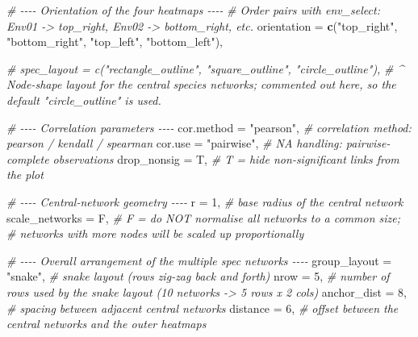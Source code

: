 \documentclass[
]{book}
\newenvironment{Shaded}{\begin{snugshade}}{\end{snugshade}}
\newcommand{\AttributeTok}[1]{\textcolor[rgb]{0.13,0.29,0.53}{#1}}
\newcommand{\CommentTok}[1]{\textcolor[rgb]{0.56,0.35,0.01}{\textit{#1}}}
\newcommand{\DecValTok}[1]{\textcolor[rgb]{0.00,0.00,0.81}{#1}}
\newcommand{\FunctionTok}[1]{\textcolor[rgb]{0.13,0.29,0.53}{\textbf{#1}}}
\newcommand{\NormalTok}[1]{#1}
\newcommand{\StringTok}[1]{\textcolor[rgb]{0.31,0.60,0.02}{#1}}
\begin{document}
\begin{Shaded}
\begin{Highlighting}[]
  \CommentTok{\# {-}{-}{-}{-} Orientation of the four heatmaps {-}{-}{-}{-}}
  \CommentTok{\# Order pairs with env\_select: Env01 {-}\textgreater{} top\_right, Env02 {-}\textgreater{} bottom\_right, etc.}
  \AttributeTok{orientation        =} \FunctionTok{c}\NormalTok{(}\StringTok{"top\_right"}\NormalTok{,}
                         \StringTok{"bottom\_right"}\NormalTok{,}
                         \StringTok{"top\_left"}\NormalTok{,}
                         \StringTok{"bottom\_left"}\NormalTok{),}

  \CommentTok{\# spec\_layout      = c("rectangle\_outline", "square\_outline", "circle\_outline"),}
  \CommentTok{\# \^{} Node{-}shape layout for the central species networks; commented out here, so the default "circle\_outline" is used.}

  \CommentTok{\# {-}{-}{-}{-} Correlation parameters {-}{-}{-}{-}}
  \AttributeTok{cor.method         =} \StringTok{"pearson"}\NormalTok{,            }\CommentTok{\# correlation method: pearson / kendall / spearman}
  \AttributeTok{cor.use            =} \StringTok{"pairwise"}\NormalTok{,           }\CommentTok{\# NA handling: pairwise{-}complete observations}
  \AttributeTok{drop\_nonsig        =}\NormalTok{ T,                    }\CommentTok{\# T = hide non{-}significant links from the plot}

  \CommentTok{\# {-}{-}{-}{-} Central{-}network geometry {-}{-}{-}{-}}
  \AttributeTok{r                  =} \DecValTok{1}\NormalTok{,                    }\CommentTok{\# base radius of the central network}
  \AttributeTok{scale\_networks     =}\NormalTok{ F,                    }\CommentTok{\# F = do NOT normalise all networks to a common size;}
                                             \CommentTok{\#     networks with more nodes will be scaled up proportionally}

  \CommentTok{\# {-}{-}{-}{-} Overall arrangement of the multiple spec networks {-}{-}{-}{-}}
  \AttributeTok{group\_layout       =} \StringTok{"snake"}\NormalTok{,              }\CommentTok{\# snake layout (rows zig{-}zag back and forth)}
  \AttributeTok{nrow               =} \DecValTok{5}\NormalTok{,                    }\CommentTok{\# number of rows used by the snake layout (10 networks {-}\textgreater{} 5 rows x 2 cols)}
  \AttributeTok{anchor\_dist        =} \DecValTok{8}\NormalTok{,                    }\CommentTok{\# spacing between adjacent central networks}
  \AttributeTok{distance           =} \DecValTok{6}\NormalTok{,                    }\CommentTok{\# offset between the central networks and the outer heatmaps}


\end{Highlighting}
\end{Shaded}
\end{document}
